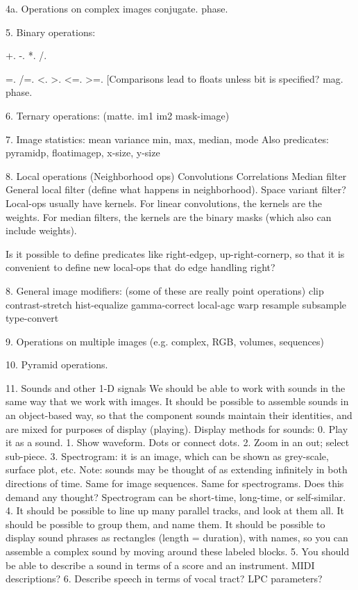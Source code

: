 4a. Operations on complex images
	conjugate.
	phase.


5. Binary operations:

	+.  -.  *.  /. 

	=.  /=.  <.  >.  <=.  >=. [Comparisons lead to floats unless
bit is specified? 
 	mag.  	phase.
	
6. Ternary operations:
	(matte. im1 im2 mask-image)

7. Image statistics:
	mean
	variance
	min, max, median, mode
	Also predicates: pyramidp, floatimagep, x-size, y-size

8. Local operations (Neighborhood ops)
	Convolutions
	Correlations
	Median filter
	General local filter (define what happens in neighborhood).
	Space variant filter?
	Local-ops usually have kernels.  For linear convolutions, the kernels
	are the weights.  For median filters, the kernels are the
	binary masks (which also can include weights).

	Is it possible to define predicates like right-edgep, up-right-cornerp,
	so that it is convenient to define new local-ops that do edge
	handling right?

8. General image modifiers:
	(some of these are really point operations)
	clip
	contrast-stretch
	hist-equalize
	gamma-correct
	local-agc
	warp
	resample
	subsample
	type-convert

9. Operations on multiple images (e.g. complex, RGB, volumes, sequences)

10. Pyramid operations.

11. Sounds and other 1-D signals
	We should be able to work with sounds in the same way that we
	work with images.  It should be possible to assemble sounds
	in an object-based way, so that the component sounds maintain
	their identities, and are mixed for purposes of display (playing).
	Display methods for sounds:
	0. Play it as a sound.
	1. Show waveform.  Dots or connect dots.
	2. Zoom in an out; select sub-piece.
	3. Spectrogram: it is an image, which can be shown as
	grey-scale, surface plot, etc. 
Note: sounds may be thought of as extending infinitely in both directions
of time.  Same for image sequences.  Same for spectrograms.  Does this
demand any thought?
	Spectrogram can be short-time, long-time, or self-similar.
	4. It should be possible to line up many parallel tracks, and
	look at them all.  It should be possible to group them, and
	name them.  It should be possible to display sound phrases as
	rectangles (length = duration), with names, so you can assemble
	a complex sound by moving around these labeled blocks.
	5. You should be able to describe a sound in terms of a
	score and an instrument.  MIDI descriptions?
	6. Describe speech in terms of vocal tract? LPC parameters?

